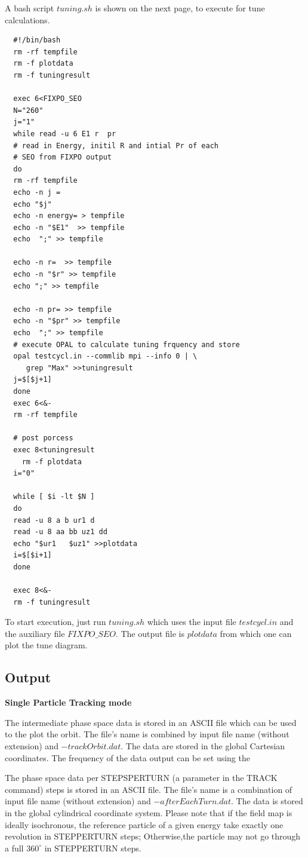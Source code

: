 A bash script $tuning.sh$ is shown on the next page, to execute \opalcycl for tune calculations.
\begin{fmpage}
\begin{footnotesize}
\begin{verbatim}
  #!/bin/bash
  rm -rf tempfile
  rm -f plotdata
  rm -f tuningresult

  exec 6<FIXPO_SEO
  N="260"
  j="1"
  while read -u 6 E1 r  pr
  # read in Energy, initil R and intial Pr of each
  # SEO from FIXPO output
  do
  rm -rf tempfile
  echo -n j =
  echo "$j"
  echo -n energy= > tempfile
  echo -n "$E1"  >> tempfile
  echo  ";" >> tempfile

  echo -n r=  >> tempfile
  echo -n "$r" >> tempfile
  echo ";" >> tempfile

  echo -n pr= >> tempfile
  echo -n "$pr" >> tempfile
  echo  ";" >> tempfile
  # execute OPAL to calculate tuning frquency and store
  opal testcycl.in --commlib mpi --info 0 | \
     grep "Max" >>tuningresult
  j=$[$j+1]
  done
  exec 6<&-
  rm -rf tempfile

  # post porcess
  exec 8<tuningresult
    rm -f plotdata
  i="0"

  while [ $i -lt $N ]
  do
  read -u 8 a b ur1 d
  read -u 8 aa bb uz1 dd
  echo "$ur1   $uz1" >>plotdata
  i=$[$i+1]
  done

  exec 8<&-
  rm -f tuningresult
\end{verbatim}
\end{footnotesize}
\end{fmpage}
To start execution, just run $tuning.sh$ which uses the input file $testcycl.in$ and the auxiliary file {\footnotesize$FIXPO\_SEO$}.
The output file is $plotdata$ from which one can plot the tune diagram.

\subsection{Output}
{\bfseries Single Particle Tracking mode}

The intermediate phase space data is stored in an ASCII file which can be used to
the plot the orbit. The file's name is combined by input file name (without extension) and  $-trackOrbit.dat$.
The data are stored in the global Cartesian coordinates.
The frequency of the data output can be set using the %

The phase space data per STEPSPERTURN (a parameter in the TRACK command) steps is stored in an ASCII file.
The file's name is a combination of input file name (without extension) and $-after$$EachTurn.dat$.
The data is stored in the global cylindrical coordinate system.
Please note that if the field map is ideally isochronous, the reference particle of a given energy take exactly one revolution in STEPPERTURN steps;
Otherwise,the particle may not go through a full $360^\circ$ in STEPPERTURN steps.

